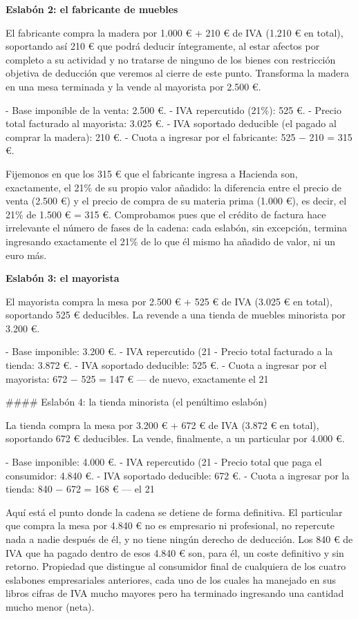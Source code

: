 \documentclass[10pt,a4paper]{article}
\begin{document}
\textbf{Eslabón 2: el fabricante de muebles}

El fabricante compra la madera por 1.000 € + 210 € de IVA (1.210 € en total), soportando así 210 € que podrá deducir íntegramente, al estar afectos por completo a su actividad y no tratarse de ninguno de los bienes con restricción objetiva de deducción que veremos al cierre de este punto. Transforma la madera en una mesa terminada y la vende al mayorista por 2.500 €.

- Base imponible de la venta: 2.500 €.
- IVA repercutido (21\%): 525 €.
- Precio total facturado al mayorista: 3.025 €.
- IVA soportado deducible (el pagado al comprar la madera): 210 €.
- Cuota a ingresar por el fabricante: 525 − 210 = 315 €.

Fijemonos en que los 315 € que el fabricante ingresa a Hacienda son, exactamente, el 21\% de su propio valor añadido: la diferencia entre el precio de venta (2.500 €) y el precio de compra de su materia prima (1.000 €), es decir, el 21\% de 1.500 € = 315 €. Comprobamos pues que el crédito de factura hace irrelevante el número de fases de la cadena: cada eslabón, sin excepción, termina ingresando exactamente el 21\% de lo que él mismo ha añadido de valor, ni un euro más.

\textbf{Eslabón 3: el mayorista}

El mayorista compra la mesa por 2.500 € + 525 € de IVA (3.025 € en total), soportando 525 € deducibles. La revende a una tienda de muebles minorista por 3.200 €.

- Base imponible: 3.200 €.
- IVA repercutido (21%
- Precio total facturado a la tienda: 3.872 €.
- IVA soportado deducible: 525 €.
- Cuota a ingresar por el mayorista: 672 − 525 = 147 € — de nuevo, exactamente el 21%

#### Eslabón 4: la tienda minorista (el penúltimo eslabón)

La tienda compra la mesa por 3.200 € + 672 € de IVA (3.872 € en total), soportando 672 € deducibles. La vende, finalmente, a un particular por 4.000 €.

- Base imponible: 4.000 €.
- IVA repercutido (21%
- Precio total que paga el consumidor: 4.840 €.
- IVA soportado deducible: 672 €.
- Cuota a ingresar por la tienda: 840 − 672 = 168 € — el 21%

Aquí está el punto donde la cadena se detiene de forma definitiva. El particular que compra la mesa por 4.840 € no es empresario ni profesional, no repercute nada a nadie después de él, y no tiene ningún derecho de deducción. Los 840 € de IVA que ha pagado dentro de esos 4.840 € son, para él, un coste definitivo y sin retorno. Propiedad que distingue al consumidor final de cualquiera de los cuatro eslabones empresariales anteriores, cada uno de los cuales ha manejado en sus libros cifras de IVA mucho mayores pero ha terminado ingresando una cantidad mucho menor (neta).
\end{document}

